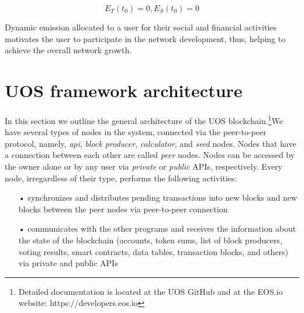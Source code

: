 \documentclass[a4paper,12pt]{article}
\begin{document}
$$
E_T(t_0)=0, E_S(t_0)=0
$$



Dynamic emission allocated to a user for their social and financial activities motivates the user to participate in the network development, thus, helping to achieve the overall network growth.

%
%

\section{U{\degree}OS framework architecture}
In this section we outline the general architecture of the U{\degree}OS blockchain.\footnote{Detailed documentation is located at the U{\degree}OS GitHub and at the EOS.io website: https://developers.eos.io}We have several types of nodes in the system, connected via the peer-to-peer protocol, namely, \emph{api}, \emph{block producer}, \emph{calculator}, and \emph{seed} nodes. Nodes that have a connection between each other are called \emph{peer} nodes. Nodes can be accessed by the owner alone or by any user via \emph{private} or \emph{public} APIs, respectively. Every node, irregardless of their type, performs the following activities:
\begin{itemize}
\item[•] synchronizes and distributes pending transactions into new blocks and new blocks between the peer nodes via peer-to-peer connection
\item[•] communicates with the other programs and receives the information about the state of the blockchain (accounts, token sums, list of block producers, voting results, smart contracts, data tables, transaction blocks, and others) via private and public APIs
\end{itemize}
\end{document}
